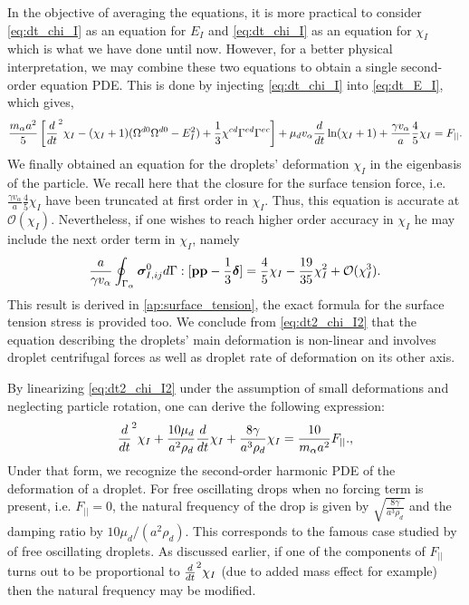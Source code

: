 In the objective of averaging the equations, it is more practical to consider \ref{eq:dt_chi_I} as an equation for $E_I$ and \ref{eq:dt_chi_I} as an equation for $\chi_I$ which is what we have done until now. 
However, for a better physical interpretation, we may combine these two equations to obtain a single second-order equation PDE. 
This is done by injecting \ref{eq:dt_chi_I} into \ref{eq:dt_E_I}, which gives, 
\begin{equation}
    \frac{m_\alpha a^2}{5} \left[
        \ddt^2 \chi_I
        - (\chi_I+1)( \Omega^{d0} \Omega^{d0}  - E_I^2) 
        + \frac{1}{3} \chi^{cd}
        \Gamma^{ed}\Gamma^{ec}
    \right]
    +  \mu_d v_\alpha \ddt \ln(\chi_I+1)
    + \frac{\gamma v_\alpha }{a} 
    \frac{4  }{5} \chi_I
    = F_{||}. 
    \label{eq:dt2_chi_I2}
\end{equation} 
We finally obtained an equation for the droplets' deformation $\chi_I$ in the eigenbasis of the particle.
We recall here that the closure for the surface tension force, i.e. $\frac{\gamma v_\alpha }{a} \frac{4  }{5} \chi_I$ have been truncated at first order in $\chi_I$.
Thus, this equation is accurate at $\mathcal{O}(\chi_I)$.
Nevertheless, if one wishes to reach higher order accuracy in $\chi_I$ he may include the next order term in $\chi_I$, namely 
\begin{equation*}
    \frac{a}{\gamma v_\alpha}\oint_{\Gamma_{\alpha}} \bm\sigma_{I,ij}^0 d\Gamma : [\textbf{pp} - \frac{1}{3} \bm\delta]
    = \frac{4}{5} \chi_I - \frac{19}{35}\chi_I^2 + \mathcal{O}(\chi_I^3). 
\end{equation*}
This result is derived in \ref{ap:surface_tension}, the exact formula for the surface tension stress is provided too.  
We conclude from \ref{eq:dt2_chi_I2} that the equation describing the droplets' main deformation is non-linear and involves droplet centrifugal forces as well as droplet rate of deformation on its other axis. 


By linearizing \ref{eq:dt2_chi_I2} under the assumption of small deformations and neglecting particle rotation, one can derive the following expression:
\begin{equation}
    \ddt^2 \chi_I
    +\frac{10 \mu_d}{a^2\rho_d}   \ddt \chi_I
    + \frac{8 \gamma }{a^3\rho_d} 
     \chi_I
    = \frac{10}{m_\alpha a^2}F_{||}. ,
    \label{eq:lamb_like_model}
\end{equation} 
Under that form, we recognize the second-order harmonic PDE of the deformation of a droplet.
For free oscillating drops when no forcing term is present, i.e. $F_{||} = 0$, the natural frequency of the drop is given by $\sqrt{\frac{8 \gamma }{a^3\rho_d}}$ and the damping ratio by $10 \mu_d  /(a^2\rho_d)$. 
This corresponds to the famous case studied by  \citet{lamb1924hydrodynamics} of free oscillating droplets. 
As discussed earlier, if one of the components of $F_{||}$ turns out to be proportional to $\frac{d}{dt}^2 \chi_I$ (due to added mass effect for example) then the natural frequency may be modified. 

